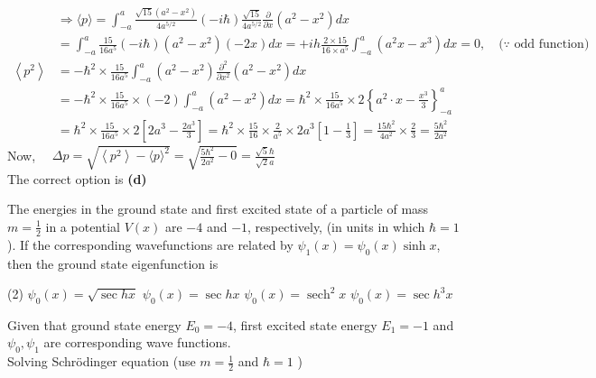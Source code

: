 \begin{enumerate}
\begin{answer}
\begin{align*}
		&\Rightarrow\langle p\rangle=\int_{-a}^{a} \frac{\sqrt{15}\left(a^{2}-x^{2}\right)}{4 a^{5 / 2}}(-i \hbar) \frac{\sqrt{15}}{4 a^{5 / 2}} \frac{\partial}{\partial x}\left(a^{2}-x^{2}\right) d x \\
		&=\int_{-a}^{a} \frac{15}{16 a^{5}}(-i \hbar)\left(a^{2}-x^{2}\right)(-2 x) d x=+i h \frac{2 \times 15}{16 \times a^{5}} \int_{-a}^{a}\left(a^{2} x-x^{3}\right) d x=0, \quad(\because \text { odd function) }\\
	\left\langle p^{2}\right\rangle &=-\hbar^{2} \times \frac{15}{16 a^{5}} \int_{-a}^{a}\left(a^{2}-x^{2}\right) \frac{\partial^{2}}{\partial x^{2}}\left(a^{2}-x^{2}\right) d x \\
	&=-\hbar^{2} \times \frac{15}{16 a^{5}} \times(-2) \int_{-a}^{a}\left(a^{2}-x^{2}\right) d x=\hbar^{2} \times \frac{15}{16 a^{5}} \times 2\left\{a^{2} \cdot x-\frac{x^{3}}{3}\right\}_{-a}^{a} \\
	&=\hbar^{2} \times \frac{15}{16 a^{5}} \times 2\left[2 a^{3}-\frac{2 a^{3}}{3}\right]=\hbar^{2} \times \frac{15}{16} \times \frac{2}{a^{5}} \times 2 a^{3}\left[1-\frac{1}{3}\right]=\frac{15 \hbar^{2}}{4 a^{2}} \times \frac{2}{3}=\frac{5 \hbar^{2}}{2 a^{2}}
	\end{align*}
	Now, $\quad \Delta p=\sqrt{\left\langle p^{2}\right\rangle-\langle p\rangle^{2}}=\sqrt{\frac{5 \hbar^{2}}{2 a^{2}}-0}=\frac{\sqrt{5} \hbar}{\sqrt{2} a}$\\
	The correct option is \textbf{(d)}
\end{answer}
\begin{minipage}{\textwidth}
	\item The energies in the ground state and first excited state of a particle of mass $m=\frac{1}{2}$ in a potential $V(x)$ are $-4$ and $-1$, respectively, (in units in which $\hbar=1$ ). If the corresponding wavefunctions are related by $\psi_{1}(x)=\psi_{0}(x) \sinh x$, then the ground state eigenfunction is
\end{minipage}
\begin{tasks}(2)
	\task[\textbf{A.}] $\psi_{0}(x)=\sqrt{\sec h x}$
	\task[\textbf{B.}]$\psi_{0}(x)=\sec h x$
	\task[\textbf{C.}]$\psi_{0}(x)=\operatorname{sech}^{2} x$
	\task[\textbf{D.}]$\psi_{0}(x)=\sec h^{3} x$
\end{tasks}
\begin{answer}
	Given that ground state energy $E_{0}=-4$, first excited state energy $E_{1}=-1$ and $\psi_{0}, \psi_{1}$ are corresponding wave functions.\\
	Solving Schrödinger equation (use $m=\frac{1}{2}$ and $\hbar=1$ )\\

\end{answer}
\end{enumerate}
